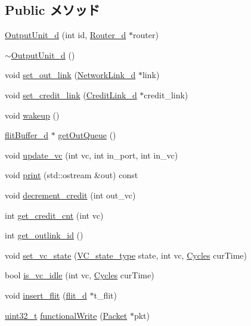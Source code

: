 \subsection*{Public メソッド}
\begin{DoxyCompactItemize}
\item 
\hyperlink{classOutputUnit__d_ac289b42d245e455ff295053759e6548c}{OutputUnit\_\-d} (int id, \hyperlink{classRouter__d}{Router\_\-d} $\ast$router)
\item 
\hyperlink{classOutputUnit__d_aef13b7a3e31e2a02ebbf47b938369b68}{$\sim$OutputUnit\_\-d} ()
\item 
void \hyperlink{classOutputUnit__d_a72a73c127bb17f1f7c2c010b3856c56c}{set\_\-out\_\-link} (\hyperlink{classNetworkLink__d}{NetworkLink\_\-d} $\ast$link)
\item 
void \hyperlink{classOutputUnit__d_aa66db9bde5f92aad3f5bbc61cc861d2a}{set\_\-credit\_\-link} (\hyperlink{classCreditLink__d}{CreditLink\_\-d} $\ast$credit\_\-link)
\item 
void \hyperlink{classOutputUnit__d_ae674290a26ecbd622c5160e38e8a4fe9}{wakeup} ()
\item 
\hyperlink{classflitBuffer__d}{flitBuffer\_\-d} $\ast$ \hyperlink{classOutputUnit__d_a672f508b05cb3b48c7c02e4ecea475bc}{getOutQueue} ()
\item 
void \hyperlink{classOutputUnit__d_a86be419f132f77f0bec3a6061db90b56}{update\_\-vc} (int vc, int in\_\-port, int in\_\-vc)
\item 
void \hyperlink{classOutputUnit__d_ac55fe386a101fbae38c716067c9966a0}{print} (std::ostream \&out) const 
\item 
void \hyperlink{classOutputUnit__d_ab998c12ca35652c419fce27547c19c73}{decrement\_\-credit} (int out\_\-vc)
\item 
int \hyperlink{classOutputUnit__d_aae610e2b37c22ba110e223da68a1e302}{get\_\-credit\_\-cnt} (int vc)
\item 
int \hyperlink{classOutputUnit__d_a3292695c6544ec346fd7f0a661d237d6}{get\_\-outlink\_\-id} ()
\item 
void \hyperlink{classOutputUnit__d_a67dafbe49b665179990b2bdadfc133c9}{set\_\-vc\_\-state} (\hyperlink{NetworkHeader_8hh_aaafaa208359111dcd9f4d47ff377da76}{VC\_\-state\_\-type} state, int vc, \hyperlink{classCycles}{Cycles} curTime)
\item 
bool \hyperlink{classOutputUnit__d_a1f286a568138e723fdd077a18b268c5e}{is\_\-vc\_\-idle} (int vc, \hyperlink{classCycles}{Cycles} curTime)
\item 
void \hyperlink{classOutputUnit__d_ae4097c9e6741b690e6388043e7bc7b64}{insert\_\-flit} (\hyperlink{classflit__d}{flit\_\-d} $\ast$t\_\-flit)
\item 
\hyperlink{Type_8hh_a435d1572bf3f880d55459d9805097f62}{uint32\_\-t} \hyperlink{classOutputUnit__d_ad07b9def1d6f5e5f988a254c3a9d1ad9}{functionalWrite} (\hyperlink{classPacket}{Packet} $\ast$pkt)
\end{DoxyCompactItemize}
